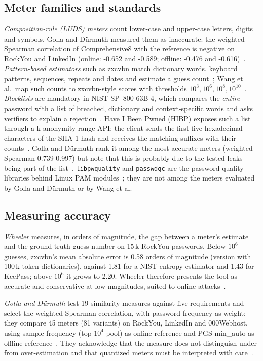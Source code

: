\documentclass[conference]{IEEEtran}
\begin{document}
\subsection{Meter families and standards}
\emph{Composition-rule (LUDS) meters} count lower-case and upper-case letters, digits and symbols. Golla and D\"urmuth measured them as inaccurate: the weighted Spearman correlation of Comprehensive8 with the reference is negative on RockYou and LinkedIn (online: -0.652 and -0.589; offline: -0.476 and -0.616)~\cite{golla2018}. \emph{Pattern-based estimators} such as zxcvbn match dictionary words, keyboard patterns, sequences, repeats and dates and estimate a guess count~\cite{wheeler2016}; Wang et al.\ map such counts to zxcvbn-style scores with thresholds $10^3, 10^6, 10^8, 10^{10}$~\cite{wang2023}. \emph{Blocklists} are mandatory in NIST SP~800-63B-4, which compares the \emph{entire} password with a list of breached, dictionary and context-specific words and asks verifiers to explain a rejection~\cite{nist80063b4}. Have I Been Pwned (HIBP) exposes such a list through a k-anonymity range API: the client sends the first five hexadecimal characters of the SHA-1 hash and receives the matching suffixes with their counts~\cite{hibp}. Golla and D\"urmuth rank it among the most accurate meters (weighted Spearman 0.739-0.997) but note that this is probably due to the tested leaks being part of the list~\cite{golla2018}. \texttt{libpwquality} and \texttt{passwdqc} are the password-quality libraries behind Linux PAM modules~\cite{pwquality,passwdqc}; they are not among the meters evaluated by Golla and D\"urmuth or by Wang et al.

\subsection{Measuring accuracy}
\emph{Wheeler} measures, in orders of magnitude, the gap between a meter's estimate and the ground-truth guess number on 15\,k RockYou passwords. Below $10^6$ guesses, zxcvbn's mean absolute error is 0.58 orders of magnitude (version with 100\,k-token dictionaries), against 1.81 for a NIST-entropy estimator and 1.43 for KeePass; above $10^6$ it grows to 2.20. Wheeler therefore presents the tool as accurate and conservative at low magnitudes, suited to online attacks~\cite{wheeler2016}.

\emph{Golla and D\"urmuth} test 19 similarity measures against five requirements and select the weighted Spearman correlation, with password frequency as weight; they compare 45 meters (81 variants) on RockYou, LinkedIn and 000Webhost, using sample frequency (top $10^4$ pool) as online reference and PGS min\_auto as offline reference~\cite{golla2018}. They acknowledge that the measure does not distinguish under- from over-estimation and that quantized meters must be interpreted with care~\cite{golla2018}.
\end{document}
